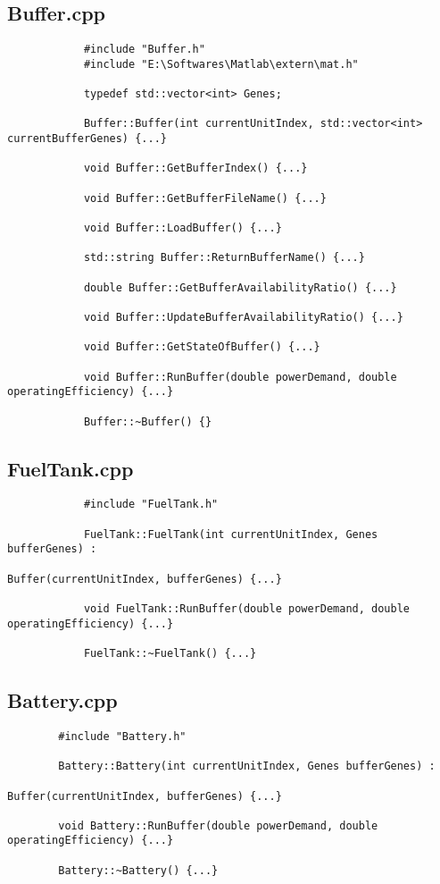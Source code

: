 \documentclass[ExampleMasters.tex]{subfiles}
\begin{document}
		\subsection{Buffer.cpp}\label{sec:appendixbuffer}
			\begin{verbatim}
			#include "Buffer.h"
			#include "E:\Softwares\Matlab\extern\mat.h"

			typedef std::vector<int> Genes;

			Buffer::Buffer(int currentUnitIndex, std::vector<int> currentBufferGenes) {...}

			void Buffer::GetBufferIndex() {...}

			void Buffer::GetBufferFileName() {...}

			void Buffer::LoadBuffer() {...}

			std::string Buffer::ReturnBufferName() {...}

			double Buffer::GetBufferAvailabilityRatio() {...}

			void Buffer::UpdateBufferAvailabilityRatio() {...}

			void Buffer::GetStateOfBuffer() {...}

			void Buffer::RunBuffer(double powerDemand, double operatingEfficiency) {...}

			Buffer::~Buffer() {}
			\end{verbatim}

		\subsection{FuelTank.cpp}\label{sec:appendixfueltank}
			\begin{verbatim}
			#include "FuelTank.h"

			FuelTank::FuelTank(int currentUnitIndex, Genes bufferGenes) : 
													Buffer(currentUnitIndex, bufferGenes) {...}

			void FuelTank::RunBuffer(double powerDemand, double operatingEfficiency) {...}

			FuelTank::~FuelTank() {...}
			\end{verbatim}

		\subsection{Battery.cpp}\label{sec:appendixbattery}
		\begin{verbatim}
		#include "Battery.h"

		Battery::Battery(int currentUnitIndex, Genes bufferGenes) : 
													Buffer(currentUnitIndex, bufferGenes) {...}

		void Battery::RunBuffer(double powerDemand, double operatingEfficiency) {...}

		Battery::~Battery() {...}
		\end{verbatim}

		\newpage
\end{document}
